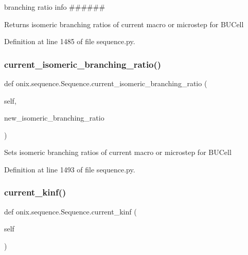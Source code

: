 branching ratio info \#\#\#\#\#\# 

\begin{DoxyVerb}Returns isomeric branching ratios of current macro or microstep
for BUCell\end{DoxyVerb}
 

Definition at line 1485 of file sequence.\+py.

\mbox{\label{classonix_1_1sequence_1_1Sequence_abb39ff0c6a2619aac3555dffeae25401}} 
\subsubsection{\texorpdfstring{current\+\_\+isomeric\+\_\+branching\+\_\+ratio()}{current\_isomeric\_branching\_ratio()}\hspace{0.1cm}{\footnotesize\ttfamily [2/2]}}
{\footnotesize\ttfamily def onix.\+sequence.\+Sequence.\+current\+\_\+isomeric\+\_\+branching\+\_\+ratio (\begin{DoxyParamCaption}\item[{}]{self,  }\item[{}]{new\+\_\+isomeric\+\_\+branching\+\_\+ratio }\end{DoxyParamCaption})}

\begin{DoxyVerb}Sets isomeric branching ratios of current macro or microstep
for BUCell\end{DoxyVerb}
 

Definition at line 1493 of file sequence.\+py.

\mbox{\label{classonix_1_1sequence_1_1Sequence_a6edc4c50dc07bb7d0c6dcfd5a644e28c}} 
\subsubsection{\texorpdfstring{current\+\_\+kinf()}{current\_kinf()}\hspace{0.1cm}{\footnotesize\ttfamily [1/2]}}
{\footnotesize\ttfamily def onix.\+sequence.\+Sequence.\+current\+\_\+kinf (\begin{DoxyParamCaption}\item[{}]{self }\end{DoxyParamCaption})}



